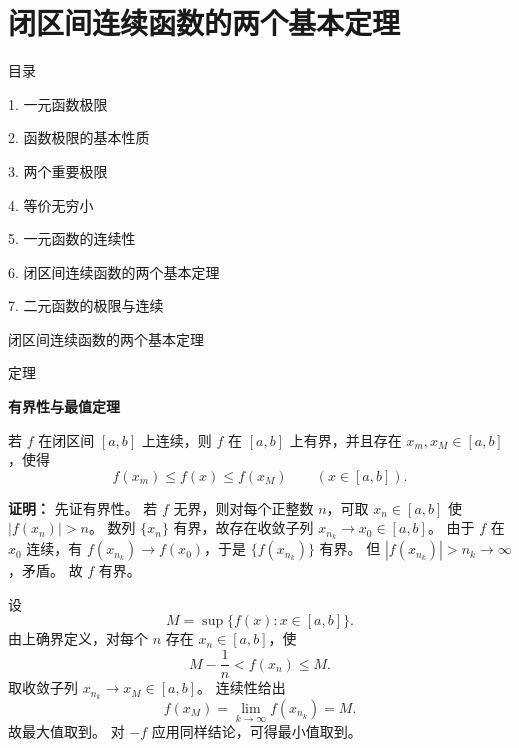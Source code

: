 \documentclass[aspectratio=169,10pt,fontset=fandol]{ctexbeamer}
\newenvironment{warning}{\par\noindent\textbf{注：}\quad}{\par\vspace{0.8em}}
\begin{document}
\section{闭区间连续函数的两个基本定理}
\begin{frame}[t,fragile]{目录}
\normalsize
{\color{black}\normalsize 1. 一元函数极限\par}\vspace{0.22em}
{\color{black}\normalsize 2. 函数极限的基本性质\par}\vspace{0.22em}
{\color{black}\normalsize 3. 两个重要极限\par}\vspace{0.22em}
{\color{black}\normalsize 4. 等价无穷小\par}\vspace{0.22em}
{\color{black}\normalsize 5. 一元函数的连续性\par}\vspace{0.22em}
{\color{blue}\normalsize 6. 闭区间连续函数的两个基本定理\par}\vspace{0.22em}
{\color{gray!40}\normalsize 7. 二元函数的极限与连续\par}\vspace{0.22em}
\end{frame}
\begin{frame}[t,fragile]{闭区间连续函数的两个基本定理}
\footnotesize
\begin{block}{定理}
{\footnotesize
\textbf{有界性与最值定理}\par

若 $f$ 在闭区间 $[a,b]$ 上连续，则 $f$ 在 $[a,b]$ 上有界，并且存在 $x_m,x_M\in[a,b]$，使得
\[
f(x_m)\le f(x)\le f(x_M)\qquad (x\in[a,b]).
\]

}
\end{block}
\pause
{\footnotesize
\textbf{证明：}
先证有界性。 若 $f$ 无界，则对每个正整数 $n$，可取 $x_n\in[a,b]$ 使 $|f(x_n)|>n$。 数列 $\{x_n\}$ 有界，故存在收敛子列 $x_{n_k}\to x_0\in[a,b]$。 由于 $f$ 在 $x_0$ 连续，有 $f(x_{n_k})\to f(x_0)$，于是 $\{f(x_{n_k})\}$ 有界。 但 $|f(x_{n_k})|>n_k\to\infty$，矛盾。 故 $f$ 有界。

设
\[
M=\sup\{f(x):x\in[a,b]\}.
\]
由上确界定义，对每个 $n$ 存在 $x_n\in[a,b]$，使
\[
M-\frac1n<f(x_n)\le M.
\]
取收敛子列 $x_{n_k}\to x_M\in[a,b]$。 连续性给出
\[
f(x_M)=\lim_{k\to\infty}f(x_{n_k})=M.
\]
故最大值取到。 对 $-f$ 应用同样结论，可得最小值取到。

}
\end{frame}
\end{document}
